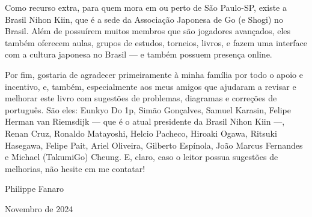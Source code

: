 Como recurso extra, para quem mora em ou perto de São Paulo-SP, existe a Brasil Nihon Kiin, que é a sede da Associação Japonesa de Go (e Shogi) no Brasil. Além de possuírem muitos membros que são jogadores avançados, eles também oferecem aulas, grupos de estudos, torneios, livros, e fazem uma interface com a cultura japonesa no Brasil --- e também possuem presença online.

Por fim, gostaria de agradecer primeiramente à minha família por todo o apoio e incentivo, e, também, especialmente aos meus amigos que ajudaram a revisar e melhorar este livro com sugestões de problemas, diagramas e correções de português. São eles: Eunkyo Do 1p, Simão Gonçalves, Samuel Karasin, Felipe Herman van Riemsdijk --- que é o atual presidente da Brasil Nihon Kiin ---, Renan Cruz, Ronaldo Matayoshi, Helcio Pacheco, Hiroaki Ogawa, Ritsuki Hasegawa, Felipe Pait, Ariel Oliveira, Gilberto Espínola, João Marcus Fernandes e Michael (TakumiGo) Cheung. E, claro, caso o leitor possua sugestões de melhorias, não hesite em me contatar!

\bigskip
\smallskip
\smallskip
\smallskip

\hspace*{\fill} Philippe Fanaro \hspace{0.055cm}

\hspace*{\fill} Novembro de 2024 \hspace{0.05cm}

\clearedpage
\clearedpage